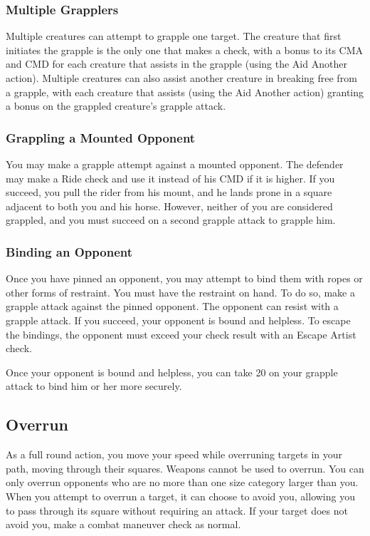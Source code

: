 \subsubsection{Multiple Grapplers}
Multiple creatures can attempt to grapple one target. The creature that first initiates the grapple is the only one that makes a check, with a  bonus to its CMA and CMD for each creature that assists in the grapple (using the Aid Another action). Multiple creatures can also assist another creature in breaking free from a grapple, with each creature that assists (using the Aid Another action) granting a  bonus on the grappled creature's grapple attack.

\subsubsection{Grappling a Mounted Opponent}
You may make a grapple attempt against a mounted opponent. The defender may make a Ride check and use it instead of his CMD if it is higher. If you succeed, you pull the rider from his mount, and he lands prone in a square adjacent to both you and his horse. However, neither of you are considered grappled, and you must succeed on a second grapple attack to grapple him.

\subsubsection{Binding an Opponent}
Once you have pinned an opponent, you may attempt to bind them with ropes or other forms of restraint. You must have the restraint on hand. To do so, make a grapple attack against the pinned opponent. The opponent can resist with a grapple attack. If you succeed, your opponent is bound and helpless. To escape the bindings, the opponent must exceed your check result with an Escape Artist check.

Once your opponent is bound and helpless, you can take 20 on your grapple attack to bind him or her more securely.

\subsection{Overrun}
As a full round action, you move your speed while overruning targets in your path, moving through their squares. Weapons cannot be used to overrun. You can only overrun opponents who are no more than one size category larger than you. When you attempt to overrun a target, it can choose to avoid you, allowing you to pass through its square without requiring an attack. If your target does not avoid you, make a combat maneuver check as normal.

